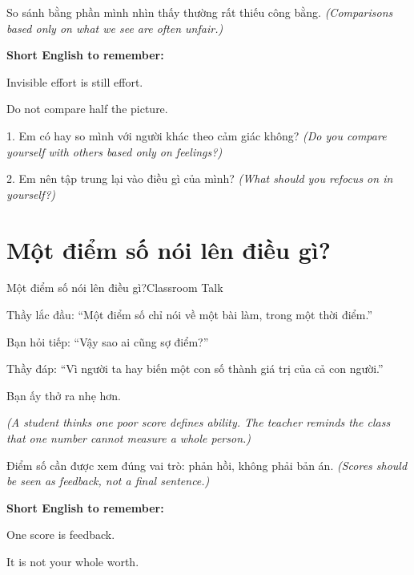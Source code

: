 \begin{baihoc}
So sánh bằng phần mình nhìn thấy thường rất thiếu công bằng.
\textit{(Comparisons based only on what we see are often unfair.)}
\end{baihoc}

\begin{ghinhoanh}
\textbf{Short English to remember:}

Invisible effort is still effort.

Do not compare half the picture.
\end{ghinhoanh}

\begin{tuhocnhanh}
1. Em có hay so mình với người khác theo cảm giác không? \textit{(Do you compare yourself with others based only on feelings?)}

2. Em nên tập trung lại vào điều gì của mình? \textit{(What should you refocus on in yourself?)}
\end{tuhocnhanh}
\ngancach

\section{Một điểm số nói lên điều gì?}
\begin{truyen}{Một điểm số nói lên điều gì?}{Classroom Talk}

Thầy lắc đầu: ``Một điểm số chỉ nói về một bài làm, trong một thời điểm.''

Bạn hỏi tiếp: ``Vậy sao ai cũng sợ điểm?''

Thầy đáp: ``Vì người ta hay biến một con số thành giá trị của cả con người.''

Bạn ấy thở ra nhẹ hơn.

\textit{(A student thinks one poor score defines ability. The teacher reminds the class that one number cannot measure a whole person.)}
\end{truyen}

\begin{baihoc}
Điểm số cần được xem đúng vai trò: phản hồi, không phải bản án.
\textit{(Scores should be seen as feedback, not a final sentence.)}
\end{baihoc}

\begin{ghinhoanh}
\textbf{Short English to remember:}

One score is feedback.

It is not your whole worth.
\end{ghinhoanh}

